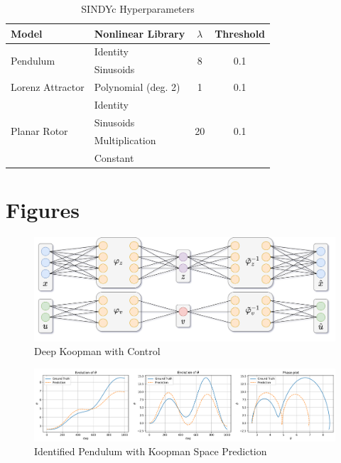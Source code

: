 \documentclass[10pt,twocolumn]{article}
\begin{document}
\begin{table}[h]
  \centering
  \begin{tabular}{llcc}
    \toprule
    Model & Nonlinear Library & $\lambda$ & Threshold \\
    \midrule

    \multirow{2}{*}{Pendulum} & Identity & \multirow{2}{*}{8} & \multirow{2}{*}{0.1} \\
    {} & Sinusoids \\
    \cmidrule{2-4}

    Lorenz Attractor & Polynomial (deg. 2) & 1 & 0.1 \\
    \cmidrule{2-4}

    \multirow{4}{*}{Planar Rotor} & Identity & \multirow{4}{*}{20} & \multirow{4}{*}{0.1} \\
    {} & Sinusoids \\
    {} & Multiplication \\
    {} & Constant \\
    \bottomrule
  \end{tabular}
  \caption{SINDYc Hyperparameters}
  \label{tbl:sindyc_params}
\end{table}

\section{Figures}

\begin{figure}[htb!]
  \centering
  \includegraphics[width=.9\textwidth]{koopman_arch}
  \caption{Deep Koopman with Control}
  \label{fig:koopman_arch}
\end{figure}

\begin{figure}[htb!]
  \centering
  \includegraphics[width=\textwidth]{koopman_predict}
  \caption{Identified Pendulum with Koopman Space Prediction}
  \label{fig:koopman_predict}
\end{figure}
\end{document}

